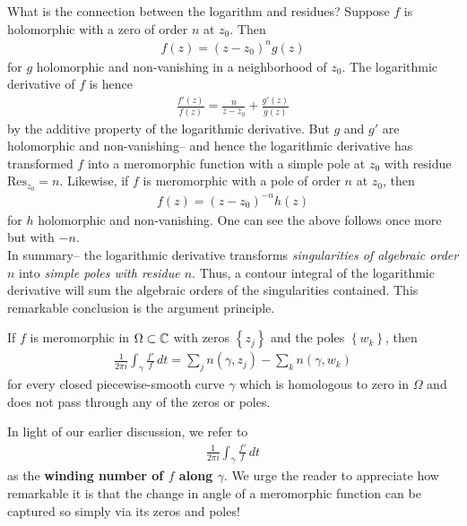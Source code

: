 \documentclass{memoir}
\begin{document}
What is the connection between the logarithm and residues? Suppose \(f\) is holomorphic with a zero of order \(n\) at \(z_0\). Then
\begin{align*}
	f(z) = (z-z_0)^{n}g(z)
\end{align*}
for \(g\) holomorphic and non-vanishing in a neighborhood of \(z_0\). The logarithmic derivative of \(f\) is hence
\begin{align*}
	\frac{f'(z)}{f(z)} = \frac{n}{z-z_0}+ \frac{g'(z)}{g(z)}
\end{align*}
by the additive property of the logarithmic derivative. But \(g\) and \(g'\) are holomorphic and non-vanishing-- and hence the logarithmic derivative has transformed \(f\) into a meromorphic function with a simple pole at \(z_0\) with residue \(\textrm{Res}_{z_0} = n\). Likewise, if \(f\) is meromorphic with a pole of order \(n\) at \(z_0\), then
\begin{align*}
	f(z) = (z-z_0)^{-n}h(z)
\end{align*}
for \(h\) holomorphic and non-vanishing. One can see the above follows once more but with \(-n\).\\

In summary-- the logarithmic derivative transforms \textit{singularities of algebraic order \(n\)} into \textit{simple poles with residue \(n\)}. Thus, a contour integral of the logarithmic derivative will sum the algebraic orders of the singularities contained. This remarkable conclusion is the argument principle.

\begin{thm}
	If \(f\) is meromorphic in \(\Omega\subset \mathbb{C} \) with zeros \(\left\{ z_j \right\}\) and the poles \(\left\{ w_k \right\} \), then
	\begin{align*}
		\frac{1}{2\pi i} \int_{\gamma} \frac{f'}{f} \,d t = \sum_{j} n(\gamma,z_j) - \sum_{k} n(\gamma,w_k) 
	\end{align*}
	for every closed piecewise-smooth curve \(\gamma\) which is homologous to zero in \(\Omega \) and does not pass through any of the zeros or poles.
\end{thm}
In light of our earlier discussion, we refer to
\begin{align*}
	\frac{1}{2\pi i} \int_\gamma \frac{f'}{f}\,d t
\end{align*}
as the \textbf{winding number of \(f\) along \(\gamma \)}. We urge the reader to appreciate how remarkable it is that the change in angle of a meromorphic function can be captured so simply via its zeros and poles!
\end{document}
